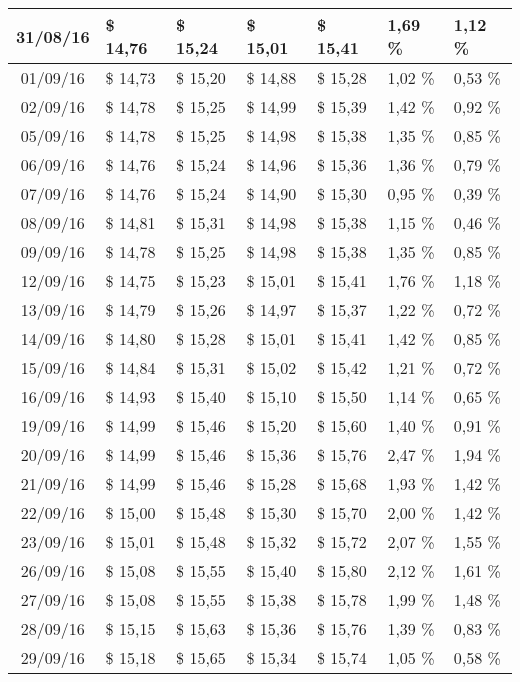 \begin{center}
\begin{longtable}{|c|p{1.5cm}|p{1.5cm}|p{1.5cm}|p{1.5cm}|p{1.5cm}|p{1.5cm}|}
31/08/16 & \$ 14,76 & \$ 15,24 & \$ 15,01 & \$ 15,41 & 1,69 \% & 1,12 \% \\ \hline
01/09/16 & \$ 14,73 & \$ 15,20 & \$ 14,88 & \$ 15,28 & 1,02 \% & 0,53 \% \\ \hline
02/09/16 & \$ 14,78 & \$ 15,25 & \$ 14,99 & \$ 15,39 & 1,42 \% & 0,92 \% \\ \hline
05/09/16 & \$ 14,78 & \$ 15,25 & \$ 14,98 & \$ 15,38 & 1,35 \% & 0,85 \% \\ \hline
06/09/16 & \$ 14,76 & \$ 15,24 & \$ 14,96 & \$ 15,36 & 1,36 \% & 0,79 \% \\ \hline
07/09/16 & \$ 14,76 & \$ 15,24 & \$ 14,90 & \$ 15,30 & 0,95 \% & 0,39 \% \\ \hline
08/09/16 & \$ 14,81 & \$ 15,31 & \$ 14,98 & \$ 15,38 & 1,15 \% & 0,46 \% \\ \hline
09/09/16 & \$ 14,78 & \$ 15,25 & \$ 14,98 & \$ 15,38 & 1,35 \% & 0,85 \% \\ \hline
12/09/16 & \$ 14,75 & \$ 15,23 & \$ 15,01 & \$ 15,41 & 1,76 \% & 1,18 \% \\ \hline
13/09/16 & \$ 14,79 & \$ 15,26 & \$ 14,97 & \$ 15,37 & 1,22 \% & 0,72 \% \\ \hline
14/09/16 & \$ 14,80 & \$ 15,28 & \$ 15,01 & \$ 15,41 & 1,42 \% & 0,85 \% \\ \hline
15/09/16 & \$ 14,84 & \$ 15,31 & \$ 15,02 & \$ 15,42 & 1,21 \% & 0,72 \% \\ \hline
16/09/16 & \$ 14,93 & \$ 15,40 & \$ 15,10 & \$ 15,50 & 1,14 \% & 0,65 \% \\ \hline
19/09/16 & \$ 14,99 & \$ 15,46 & \$ 15,20 & \$ 15,60 & 1,40 \% & 0,91 \% \\ \hline
20/09/16 & \$ 14,99 & \$ 15,46 & \$ 15,36 & \$ 15,76 & 2,47 \% & 1,94 \% \\ \hline
21/09/16 & \$ 14,99 & \$ 15,46 & \$ 15,28 & \$ 15,68 & 1,93 \% & 1,42 \% \\ \hline
22/09/16 & \$ 15,00 & \$ 15,48 & \$ 15,30 & \$ 15,70 & 2,00 \% & 1,42 \% \\ \hline
23/09/16 & \$ 15,01 & \$ 15,48 & \$ 15,32 & \$ 15,72 & 2,07 \% & 1,55 \% \\ \hline
26/09/16 & \$ 15,08 & \$ 15,55 & \$ 15,40 & \$ 15,80 & 2,12 \% & 1,61 \% \\ \hline
27/09/16 & \$ 15,08 & \$ 15,55 & \$ 15,38 & \$ 15,78 & 1,99 \% & 1,48 \% \\ \hline
28/09/16 & \$ 15,15 & \$ 15,63 & \$ 15,36 & \$ 15,76 & 1,39 \% & 0,83 \% \\ \hline
29/09/16 & \$ 15,18 & \$ 15,65 & \$ 15,34 & \$ 15,74 & 1,05 \% & 0,58 \% \\ \hline

\end{longtable}
\end{center}
